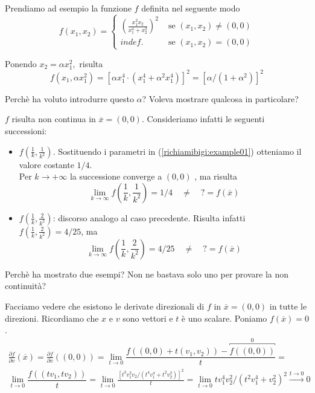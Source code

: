 \begin{example}
Prendiamo ad esempio la funzione $f$ definita nel seguente modo
\begin{equation}
\label{richiamibigi:example01}
f(x_1,x_2) =
\begin{cases}
\left(\frac{x_1^2 x_2}{x_1^4+x_2^2}\right)^2 & \text{ se } (x_1,x_2) \neq (0,0)\\
indef. & \text{ se } (x_1,x_2) = (0,0)
\end{cases}
\end{equation}

Ponendo  $x_2 = \alpha x_1^2,$  risulta
$$f(x_1, \alpha x_1^2) = \left[\alpha x_1^4 \cdot (x_1^4 + \alpha^2 x_1^4 ) \right]^2 = \left[\alpha / (1+ \alpha^2 ) \right]^2$$

\begin{openquestion}
  Perch\`e ha voluto introdurre questo $\alpha$?
  Voleva mostrare qualcosa in particolare?
\end{openquestion}

$f$ risulta non continua in $\overline{x} = (0,0)$.
Consideriamo infatti le seguenti successioni:

\begin{itemize}
\item $f(\frac{1}{k}, \frac{1}{k^2})$. Sostituendo i parametri
  in (\ref{richiamibigi:example01}) otteniamo il valore costante
  $1/4$.\\
 Per $k \to +\infty$ la successione converge a $(0,0)$ , ma risulta
 $$ \lim_{ k \to \infty} f\left(\frac{1}{k}, \frac{1}{k^2}\right) = 1/4
     \quad \neq \quad 
     ? = f(\overline{x})
 $$
\item $f(\frac{1}{k}, \frac{2}{k^2})$: discorso analogo al caso precedente.
Risulta infatti $f(\frac{1}{k}, \frac{2}{k^2}) = 4/25$, ma
 $$ \lim_{ k \to \infty} f\left(\frac{1}{k}, \frac{2}{k^2}\right) = 4/25
 \quad \neq \quad 
? = f(\overline{x})
$$
\end{itemize}

\begin{openquestion}
Perch\`e ha mostrato due esempi? Non ne bastava solo uno per
provare la non continuit\`a?
\end{openquestion}
Facciamo vedere che esistono le derivate direzionali di $f$
in $\overline{x}=(0,0)$ in tutte le direzioni. Ricordiamo
che $x$ e $v$ sono vettori e $t$ \`e uno scalare.
Poniamo $f(\overline{x}) = 0$.
$$
\begin{array}{c}
\displaystyle \frac{\partial f}{\partial v}(\overline{x})=
\displaystyle \frac{\partial f}{\partial v}((0,0))=
\displaystyle  \lim_{t \to 0}
\dfrac{f\left(\left(0,0 \right) + t\left(v_1,v_2 \right) \right) - 
\overbracket{f((0,0))}^{0}}{t} = \\
\displaystyle  \lim_{t \to 0}
 \dfrac{f \left(\left(tv_1,tv_2 \right) \right)}{t} =
\displaystyle  \lim_{t \to 0}\frac{[t^3 v_1^2 v_2 /(t^4 v_1^4 + t^2 v_2^2)]^2}{t} 
= \displaystyle \lim_{t \to 0} t v_1^{4} v_2^{2} / (t^2 v_1^4 + v_2^2)^2 
  \xrightarrow{t \to 0} 0
\end{array}
$$
\end{example}
